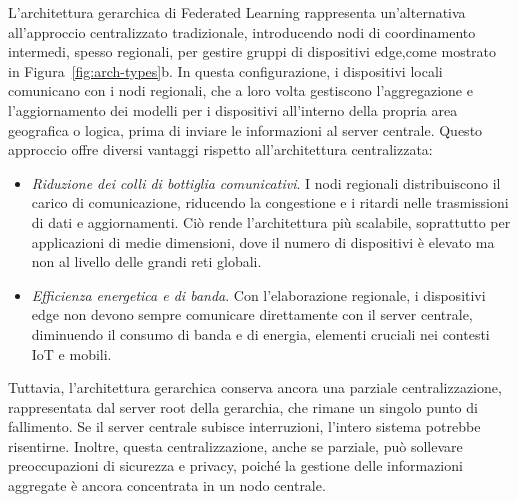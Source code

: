 \documentclass[a4paper, oneside, openright]{report}
\begin{document}
L'architettura gerarchica di Federated Learning rappresenta un'alternativa all'approccio centralizzato tradizionale, introducendo nodi di coordinamento intermedi, spesso regionali, per gestire gruppi di dispositivi edge,come mostrato in Figura~\ref{fig:arch-types}b. In questa configurazione, i dispositivi locali comunicano con i nodi regionali, che a loro volta gestiscono l'aggregazione e l'aggiornamento dei modelli per i dispositivi all'interno della propria area geografica o logica, prima di inviare le informazioni al server centrale. Questo approccio offre diversi vantaggi rispetto all'architettura centralizzata:
\begin{itemize}
\item \textit{Riduzione dei colli di bottiglia comunicativi}. I nodi regionali distribuiscono il carico di comunicazione, riducendo la congestione e i ritardi nelle trasmissioni di dati e aggiornamenti. Ciò rende l'architettura più scalabile, soprattutto per applicazioni di medie dimensioni, dove il numero di dispositivi è elevato ma non al livello delle grandi reti globali.
\item \textit{Efficienza energetica e di banda}. Con l’elaborazione regionale, i dispositivi edge non devono sempre comunicare direttamente con il server centrale, diminuendo il consumo di banda e di energia, elementi cruciali nei contesti IoT e mobili.
\end{itemize}

Tuttavia, l'architettura gerarchica conserva ancora una parziale centralizzazione, rappresentata dal server root della gerarchia, che rimane un singolo punto di fallimento. Se il server centrale subisce interruzioni, l’intero sistema potrebbe risentirne. Inoltre, questa centralizzazione, anche se parziale, può sollevare preoccupazioni di sicurezza e privacy, poiché la gestione delle informazioni aggregate è ancora concentrata in un nodo centrale.
\end{document}
